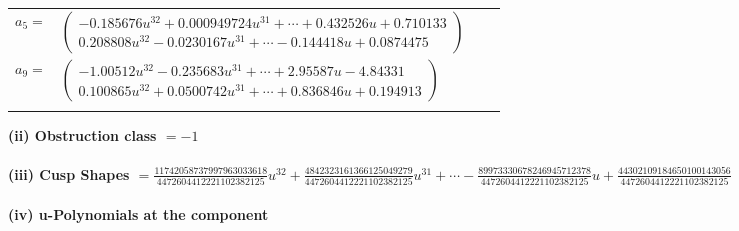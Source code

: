 \documentclass[1p]{elsarticle_modified}
\theoremstyle{definition}
\begin{document}
\begin{tabular}{m{7pt} m{180pt} m{7pt} m{180pt} }
\flushright $a_{5}=$&$\begin{pmatrix}-0.185676 u^{32}+0.000949724 u^{31}+\cdots+0.432526 u+0.710133\\0.208808 u^{32}-0.0230167 u^{31}+\cdots-0.144418 u+0.0874475\end{pmatrix}$ \\
\flushright $a_{9}=$&$\begin{pmatrix}-1.00512 u^{32}-0.235683 u^{31}+\cdots+2.95587 u-4.84331\\0.100865 u^{32}+0.0500742 u^{31}+\cdots+0.836846 u+0.194913\end{pmatrix}$\\&\end{tabular}
\flushleft \textbf{(ii) Obstruction class $= -1$}\\~\\
\flushleft \textbf{(iii) Cusp Shapes $= \frac{11742058737997963033618}{4472604412221102382125} u^{32}+\frac{4842323161366125049279}{4472604412221102382125} u^{31}+\cdots-\frac{89973330678246945712378}{4472604412221102382125} u+\frac{44302109184650100143056}{4472604412221102382125}$}\\~\\
\newpage\renewcommand{\arraystretch}{1}
\flushleft \textbf{(iv) u-Polynomials at the component}\newline \\
\end{document}

